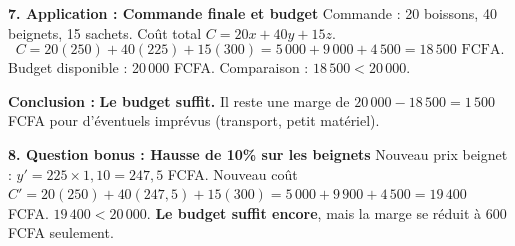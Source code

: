 \documentclass[11pt]{article}
\begin{document}
\begin{exoresolu}
\textbf{7. Application : Commande finale et budget}
Commande : 20 boissons, 40 beignets, 15 sachets.
Coût total $C = 20x + 40y + 15z$.
\[
C = 20(250) + 40(225) + 15(300) = 5\,000 + 9\,000 + 4\,500 = 18\,500 \text{ FCFA}.
\]
Budget disponible : 20\,000 FCFA.
Comparaison : $18\,500 < 20\,000$.

\textbf{Conclusion :} \textbf{Le budget suffit.} Il reste une marge de $20\,000 - 18\,500 = 1\,500$ FCFA pour d'éventuels imprévus (transport, petit matériel).

\textbf{8. Question bonus : Hausse de 10\% sur les beignets}
Nouveau prix beignet : $y' = 225 \times 1,10 = 247,5$ FCFA.
Nouveau coût $C' = 20(250) + 40(247,5) + 15(300) = 5\,000 + 9\,900 + 4\,500 = 19\,400$ FCFA.
$19\,400 < 20\,000$. \textbf{Le budget suffit encore}, mais la marge se réduit à 600 FCFA seulement.
\end{exoresolu}
\end{document}
